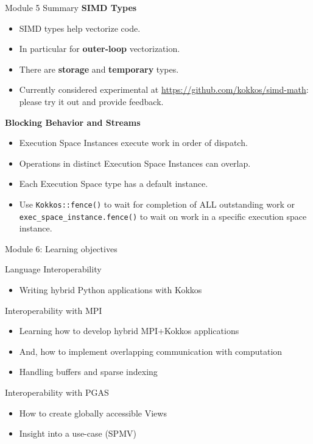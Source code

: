 \begin{frame}[fragile]{Module 5 Summary}
\textbf{SIMD Types}
	\begin{itemize}
		\item{SIMD types help vectorize code.}
		\item{In particular for \textbf{outer-loop} vectorization.}
		\item{There are \textbf{storage} and \textbf{temporary} types.}
		\item{Currently considered experimental at \url{https://github.com/kokkos/simd-math}: please try it out and provide feedback.}
	\end{itemize}

\textbf{Blocking Behavior and Streams}
  \begin{itemize}
    \item{Execution Space Instances execute work in order of dispatch.}
    \item{Operations in distinct Execution Space Instances can overlap.}
    \item{Each Execution Space type has a default instance.}
    \item{Use \texttt{Kokkos::fence()} to wait for completion of ALL outstanding work or \texttt{exec\_space\_instance.fence()} to wait on work in a specific execution space instance.}
  \end{itemize}

\end{frame}


\begin{frame}{Module 6: Learning objectives}
  \begin{block}{Language Interoperability}
    \begin{itemize}
    \item Writing hybrid Python applications with Kokkos
  \end{itemize}
  \end{block}

  \begin{block}{Interoperability with MPI}
  \begin{itemize}
    \item Learning how to develop hybrid MPI+Kokkos applications
    \item And, how to implement overlapping communication with computation
    \item Handling buffers and sparse indexing
  \end{itemize}
  \end{block}

  \begin{block}{Interoperability with PGAS}
  \begin{itemize}
    \item How to create globally accessible Views
    \item Insight into a use-case (SPMV)
  \end{itemize}
  \end{block}
\end{frame}

